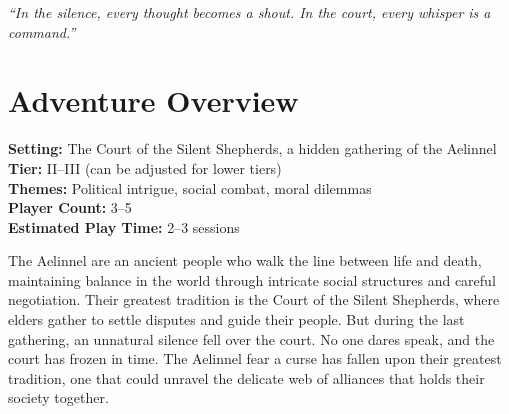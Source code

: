 \documentclass{article}
\begin{document}




\begin{center}
\textit{``In the silence, every thought becomes a shout. In the court, every whisper is a command.''}
\end{center}

\begin{abstract}
The Court of the Silent Shepherds, the gathering place of Aelinnel elders, has fallen into an unnatural silence. No one dares speak, and the court has frozen in time. The Aelinnel fear a curse has fallen upon their greatest tradition, one that could unravel the delicate web of alliances that holds their society together. This adventure is designed for Fate's Edge and specifically targets fans of Vampire: The Masquerade, preserving political intrigue and social combat while emphasizing narrative consequences. The court itself is a web of alliances and rivalries, with a ``Court Tension Timer '' tracking the growing pressure of the silence. Players must navigate the frozen court, break the silence without paying too high a price, and restore the court before the Aelinnel lose their way.
\end{abstract}


\section{Adventure Overview}

\begin{adventurebox}
\textbf{Setting:} The Court of the Silent Shepherds, a hidden gathering of the Aelinnel \\
\textbf{Tier:} II--III (can be adjusted for lower tiers) \\
\textbf{Themes:} Political intrigue, social combat, moral dilemmas \\
\textbf{Player Count:} 3--5 \\
\textbf{Estimated Play Time:} 2--3 sessions
\end{adventurebox}

The Aelinnel are an ancient people who walk the line between life and death, maintaining balance in the world through intricate social structures and careful negotiation. Their greatest tradition is the Court of the Silent Shepherds, where elders gather to settle disputes and guide their people. But during the last gathering, an unnatural silence fell over the court. No one dares speak, and the court has frozen in time. The Aelinnel fear a curse has fallen upon their greatest tradition, one that could unravel the delicate web of alliances that holds their society together.
\end{document}
